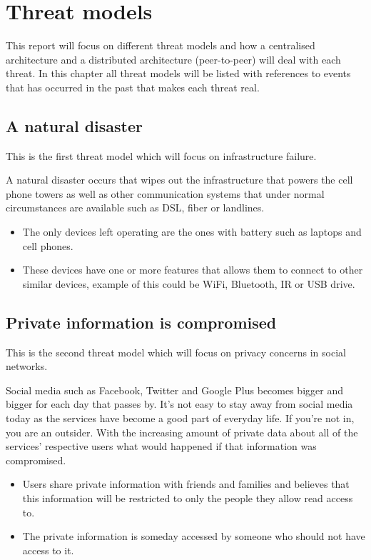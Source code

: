 \section{Threat models}
This report will focus on different threat models and how a centralised architecture and a distributed architecture (peer-to-peer) will deal with each threat.
In this chapter all threat models will be listed with references to events that has occurred in the past that makes each threat real.

\subsection{A natural disaster}
This is the first threat model which will focus on infrastructure failure.

A natural disaster occurs that wipes out the infrastructure that powers the cell phone towers as well as other communication systems that under normal circumstances are available such as DSL, fiber or landlines.
\begin{itemize}
  \item The only devices left operating are the ones with battery such as laptops and cell phones.
  \item These devices have one or more features that allows them to connect to other similar devices, example of this could be WiFi, Bluetooth, IR or USB drive.
\end{itemize}

\subsection{Private information is compromised}
This is the second threat model which will focus on privacy concerns in social networks.

Social media such as Facebook, Twitter and Google Plus becomes bigger and bigger for each day that passes by.
It's not easy to stay away from social media today as the services have become a good part of everyday life.
If you're not in, you are an outsider. 
With the increasing amount of private data about all of the services' respective users what would happened if that information was compromised.

\begin{itemize}
  \item Users share private information with friends and families and believes that this information will be restricted to only the people they allow read access to.
  \item The private information is someday accessed by someone who should not have access to it. 
\end{itemize}

